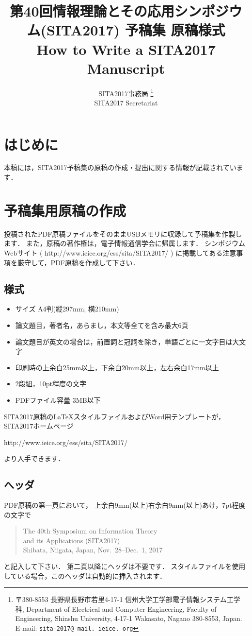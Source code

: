 \documentclass{jarticle}
\title{
  第40回情報理論とその応用シンポジウム(SITA2017) 予稿集 原稿様式\\
  How to Write a SITA2017 Manuscript
}
\author{
  SITA2017事務局
  \thanks{ %
  〒380-8553 長野県長野市若里4-17-1 信州大学工学部電子情報システム工学科, 
  Department of Electrical and Computer Engineering, 
  Faculty of Engineering, Shinshu University, 
  4-17-1 Wakasato, Nagano 380-8553, Japan. 
  E-mail: {\tt sita-2017@\allowbreak
  mail.\allowbreak
  ieice.\allowbreak
  org}
  }\\
  SITA2017 Secretariat
}
\begin{document}
\maketitle

\section{はじめに}

本稿には，SITA2017予稿集の原稿の作成・提出に関する情報が記載されています．

\section{予稿集用原稿の作成}

投稿されたPDF原稿ファイルをそのままUSBメモリに収録して予稿集を作製します．
また，原稿の著作権は，電子情報通信学会に帰属します．
シンポジウムWebサイト
( http://www.ieice.org/ess/sita/SITA2017/ )
に掲載してある注意事項を厳守して，PDF原稿を作成して下さい．

\subsection{様式}

\begin{itemize}
\item サイズ A4判(縦297mm, 横210mm)
\item 論文題目，著者名，あらまし，本文等全てを含み最大6頁
\item 論文題目が英文の場合は，前置詞と冠詞を除き，単語ごとに一文字目は大文字
\item 印刷時の上余白25mm以上，下余白20mm以上，左右余白17mm以上
\item 2段組，10pt程度の文字
\item PDFファイル容量 3MB以下
\end{itemize}
SITA2017原稿の\LaTeX スタイルファイルおよびWord用テンプレートが，SITA2017ホームページ
\begin{center}
http://www.ieice.org/ess/sita/SITA2017/
\end{center}
より入手できます．

\subsection{へッダ}

PDF原稿の第一頁において，
上余白9mm(以上)右余白9mm(以上)あけ，7pt程度の文字で

\begin{quotation}
{\footnotesize
\noindent The 40th Symposium on Information Theory\\
and its Applications (SITA2017)\\
Shibata, Niigata, Japan, Nov.\ 28--Dec.\ 1, 2017
}
\end{quotation}
と記入して下さい．
第二頁以降にヘッダは不要です．
スタイルファイルを使用している場合，このへッダは自動的に挿入されます．
\end{document}
